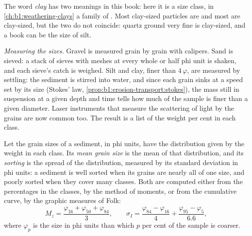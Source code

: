 The word \emph{clay} has two meanings in this book: here it is a size class, in
\cref{ch:b1:weathering-clays} a family of . Most clay-sized particles
are  and most  are clay-sized, but the two do not
coincide: quartz ground very fine is clay-sized, and a  book can be
the size of silt.

\emph{Measuring the sizes.} Gravel is measured grain by grain with calipers.
Sand is sieved: a stack of sieves with meshes at every whole or half phi unit
is shaken, and each sieve's catch is weighed. Silt and clay, finer than
$4\,\varphi$, are measured by settling: the sediment is stirred into water, and
since each grain sinks at a speed set by its size (Stokes' law,
\cref{prop:b1:erosion-transport:stokes}), the mass still in suspension at a
given depth and time tells how much of the sample is finer than a given
diameter. Laser instruments that measure the scattering of light by the grains
are now common too. The result is a list of the weight per cent in each class.

\begin{definition}\label{def:b1:clastic-sediments:sorting}
Let the grain sizes of a sediment, in phi units, have the distribution given by
the weight in each class. Its \emph{mean grain size} is
the mean of that distribution, and its \emph{sorting} is the
spread of the distribution, measured by its standard deviation in phi units: a
sediment is well sorted when its grains are nearly all of one size, and poorly
sorted when they cover many classes. Both are computed either from the
percentages in the classes, by the method of moments, or from the cumulative
curve, by the graphic measures of Folk:
\[
  M_z = \frac{\varphi_{16} + \varphi_{50} + \varphi_{84}}{3}, \qquad
  \sigma_I = \frac{\varphi_{84} - \varphi_{16}}{4} + \frac{\varphi_{95} - \varphi_{5}}{6.6},
\]
where $\varphi_p$ is the size in phi units than which $p$ per cent of the sample
is coarser.
\end{definition}

